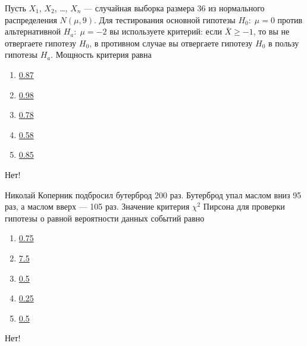 \documentclass[t]{beamer}
\begin{document}
 \begin{frame} \label{45-No} 
\begin{block}{45} 

Пусть $X_1$, $X_2$, \ldots, $X_n$ — случайная выборка размера 36 из нормального распределения $N(\mu, 9)$. Для тестирования основной гипотезы  $H_0: \; \mu=0$  против альтернативной $H_a: \; \mu=-2$   вы используете критерий: если  $\bar{X}\geq -1$, то вы не отвергаете гипотезу $H_0$, в противном случае вы отвергаете гипотезу  $H_0$ в пользу гипотезы  $H_a$. Мощность критерия равна
 


 \end{block} 
\begin{enumerate} 
\item[] \hyperlink{45-No}{\beamergotobutton{} 0.87}
\item[] \hyperlink{45-Yes}{\beamergotobutton{} 0.98}
\item[] \hyperlink{45-No}{\beamergotobutton{} 0.78}
\item[] \hyperlink{45-No}{\beamergotobutton{} 0.58}
\item[] \hyperlink{45-No}{\beamergotobutton{} 0.85}
\end{enumerate} 

 \alert{Нет!} 
\end{frame} 


 \begin{frame} \label{46-No} 
\begin{block}{46} 

Николай Коперник подбросил бутерброд 200 раз. Бутерброд упал маслом вниз 95 раз, а маслом вверх — 105 раз. Значение критерия $\chi^2$ Пирсона для проверки гипотезы о равной вероятности данных событий равно
 


 \end{block} 
\begin{enumerate} 
\item[] \hyperlink{46-No}{\beamergotobutton{} 0.75}
\item[] \hyperlink{46-No}{\beamergotobutton{} 7.5}
\item[] \hyperlink{46-No}{\beamergotobutton{} 0.5}
\item[] \hyperlink{46-No}{\beamergotobutton{} 0.25}
\item[] \hyperlink{46-Yes}{\beamergotobutton{} 0.5}
\end{enumerate} 

 \alert{Нет!} 
\end{frame} 
\end{document}

